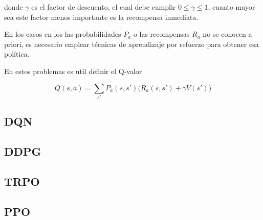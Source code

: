 donde $\gamma$ es el factor de descuento, el cual debe cumplir $0 \le \gamma \le 1$, cuanto mayor sea este factor menos importante es la recompensa inmediata. 

En los casos en los las probabilidades $P_a$ o las recompensas $R_a$ no se conocen a priori, es necesario emplear técnicas de aprendizaje por refuerzo para obtener esa política.

En estos problemas es util definir el Q-valor

\begin{equation}
Q(s,a) = \sum_{s'}P_a(s,s')\big(R_a(s,s')+\gamma V(s') \big)
\end{equation}

\subsection{DQN}
\subsection{DDPG}
\subsection{TRPO}
\subsection{PPO}